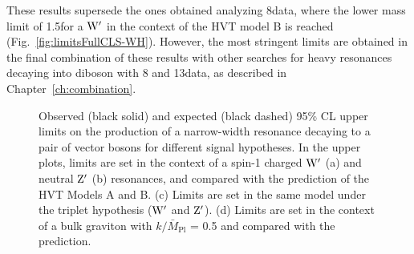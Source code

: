 These results supersede the ones obtained analyzing 8\TeV data, where the lower mass limit of 1.5\TeV for a $\mathrm{W}^\prime$ in the context of the HVT model B is reached (Fig.~\ref{fig:limitsFullCLS-WH}).
However, the most stringent limits are obtained in the final combination of these results with other searches for heavy resonances decaying into diboson with 8 and 13\TeV data, as described in Chapter~\ref{ch:combination}.

\begin{figure}[!htb]
\centering
{}
\caption{Observed (black solid) and expected (black dashed) 95\% CL upper limits on the production of a narrow-width resonance decaying to a pair of vector bosons for different signal hypotheses.
In the upper plots, limits are set in the context of a spin-1 charged $\mathrm{W}^\prime$ (a) and neutral $\mathrm{Z}^\prime$ (b) resonances, and compared with the prediction of the HVT Models A and B.
(c) Limits are set in the same model under the triplet hypothesis ($\mathrm{W}^\prime$ and $\mathrm{Z}^\prime$). (d) Limits are set in the context of a bulk graviton with $k/\bar{M}_\mathrm{Pl}$ = 0.5 and compared with the prediction.
}
\label{fig:limitsAsympt-WV}
\end{figure}
